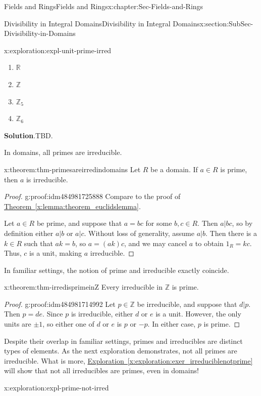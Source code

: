 \documentclass[oneside,10pt,]{book}
\newcommand{\blocktitlefont}{\relax}
\newcommand{\xreffont}{\relax}
\numberwithin{equation}{section}
\def\Z{{\mathbb Z}}
\def\R{{\mathbb R}}
\begin{document}
\begin{chapterptx}{Fields and Rings}{}{Fields and Rings}{}{}{x:chapter:Sec-Fields-and-Rings}
\begin{sectionptx}{Divisibility in Integral Domains}{}{Divisibility in Integral Domains}{}{}{x:section:SubSec-Divisibility-in-Domains}
\begin{exploration}{}{x:exploration:expl-unit-prime-irred}
%
\begin{enumerate}
\item{}\(\displaystyle \R\)%
\item{}\(\displaystyle \Z\)%
\item{}\(\displaystyle \Z_{5}\)%
\item{}\(\displaystyle \Z_6\)%
\end{enumerate}
\par\smallskip%
\noindent\textbf{\blocktitlefont Solution}.\hypertarget{g:solution:idm484981729200}{}\quad{}TBD.%
\end{exploration}
In domains, all primes are irreducible.%
\begin{theorem}{}{}{x:theorem:thm-primesareirredindomains}%
Let \(R\) be a domain. If \(a\in R\) is prime, then \(a\) is irreducible.%
\end{theorem}
\begin{proof}{}{g:proof:idm484981725888}
Compare to the proof of \hyperref[x:lemma:theorem_euclidslemma]{Theorem~{\xreffont\ref{x:lemma:theorem_euclidslemma}}}.%
\par
Let \(a\in R\) be prime, and suppose that \(a = bc\) for some \(b,c\in R\). Then \(a|bc\), so by definition either \(a|b\) or \(a|c\). Without loss of generality, assume \(a|b\). Then there is a \(k\in R\) such that \(ak=b\), so \(a = (ak)c\), and we may cancel \(a\) to obtain \(1_R = kc\). Thus, \(c\) is a unit, making \(a\) irreducible.%
\end{proof}
In familiar settings, the notion of prime and irreducible exactly coincide.%
\begin{theorem}{}{}{x:theorem:thm-irredisprimeinZ}%
Every irreducible in \(\Z\) is prime.%
\end{theorem}
\begin{proof}{}{g:proof:idm484981714992}
Let \(p\in \Z\) be irreducible, and suppose that \(d|p\). Then \(p = de\). Since \(p\) is irreducible, either \(d\) or \(e\) is a unit. However, the only units are \(\pm 1\), so either one of \(d\) or \(e\) is \(p\) or \(-p\). In either case, \(p\) is prime.%
\end{proof}
Despite their overlap in familiar settings, primes and irreducibles are distinct types of elements. As the next exploration demonstrates, not all primes are irreducible. What is more, \hyperref[x:exploration:exer_irreduciblenotprime]{Exploration~{\xreffont\ref{x:exploration:exer_irreduciblenotprime}}} will show that not all irreducibles are primes, even in domains!%
\begin{exploration}{}{x:exploration:expl-prime-not-irred}%

\end{exploration}
\end{sectionptx}
\end{chapterptx}
\end{document}
